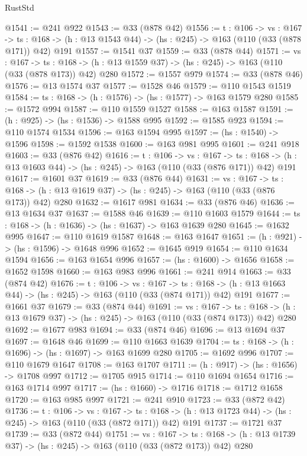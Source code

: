 \begin{lexlean}{RustStd}
\begin{coremodule}
@1541 := @241 @922
@1543 := @33 (@878 @42)
@1556 := {t : @106} ->
  {vs : @167} ->
  {ts : @168} -> (h : @13 @1543 @44) -> (hs : @245) -> @163 (@110 (@33 (@878 @171)) @42) @191
@1557 := @1541 @37
@1559 := @33 (@878 @44)
@1571 := {vs : @167} ->
  {ts : @168} -> (h : @13 @1559 @37) -> (hs : @245) -> @163 (@110 (@33 (@878 @173)) @42) @280
@1572 := @1557 @979
@1574 := @33 (@878 @46)
@1576 := @13 @1574 @37
@1577 := @1528 @46
@1579 := @110 @1543 @1519
@1584 := {ts : @168} -> (h : @1576) -> (hs : @1577) -> @163 @1579 @280
@1585 := @1572 @994
@1587 := @110 @1559 @1527
@1588 := @163 @1587
@1591 := (h : @925) -> (hs : @1536) -> @1588 @995
@1592 := @1585 @923
@1594 := @110 @1574 @1534
@1596 := @163 @1594 @995
@1597 := (hs : @1540) -> @1596
@1598 := @1592 @1538
@1600 := @163 @981 @995
@1601 := @241 @918
@1603 := @33 (@876 @42)
@1616 := {t : @106} ->
  {vs : @167} ->
  {ts : @168} -> (h : @13 @1603 @44) -> (hs : @245) -> @163 (@110 (@33 (@876 @171)) @42) @191
@1617 := @1601 @37
@1619 := @33 (@876 @44)
@1631 := {vs : @167} ->
  {ts : @168} -> (h : @13 @1619 @37) -> (hs : @245) -> @163 (@110 (@33 (@876 @173)) @42) @280
@1632 := @1617 @981
@1634 := @33 (@876 @46)
@1636 := @13 @1634 @37
@1637 := @1588 @46
@1639 := @110 @1603 @1579
@1644 := {ts : @168} -> (h : @1636) -> (hs : @1637) -> @163 @1639 @280
@1645 := @1632 @995
@1647 := @110 @1619 @1587
@1648 := @163 @1647
@1651 := (h : @921) -> (hs : @1596) -> @1648 @996
@1652 := @1645 @919
@1654 := @110 @1634 @1594
@1656 := @163 @1654 @996
@1657 := (hs : @1600) -> @1656
@1658 := @1652 @1598
@1660 := @163 @983 @996
@1661 := @241 @914
@1663 := @33 (@874 @42)
@1676 := {t : @106} ->
  {vs : @167} ->
  {ts : @168} -> (h : @13 @1663 @44) -> (hs : @245) -> @163 (@110 (@33 (@874 @171)) @42) @191
@1677 := @1661 @37
@1679 := @33 (@874 @44)
@1691 := {vs : @167} ->
  {ts : @168} -> (h : @13 @1679 @37) -> (hs : @245) -> @163 (@110 (@33 (@874 @173)) @42) @280
@1692 := @1677 @983
@1694 := @33 (@874 @46)
@1696 := @13 @1694 @37
@1697 := @1648 @46
@1699 := @110 @1663 @1639
@1704 := {ts : @168} -> (h : @1696) -> (hs : @1697) -> @163 @1699 @280
@1705 := @1692 @996
@1707 := @110 @1679 @1647
@1708 := @163 @1707
@1711 := (h : @917) -> (hs : @1656) -> @1708 @997
@1712 := @1705 @915
@1714 := @110 @1694 @1654
@1716 := @163 @1714 @997
@1717 := (hs : @1660) -> @1716
@1718 := @1712 @1658
@1720 := @163 @985 @997
@1721 := @241 @910
@1723 := @33 (@872 @42)
@1736 := {t : @106} ->
  {vs : @167} ->
  {ts : @168} -> (h : @13 @1723 @44) -> (hs : @245) -> @163 (@110 (@33 (@872 @171)) @42) @191
@1737 := @1721 @37
@1739 := @33 (@872 @44)
@1751 := {vs : @167} ->
  {ts : @168} -> (h : @13 @1739 @37) -> (hs : @245) -> @163 (@110 (@33 (@872 @173)) @42) @280

\end{coremodule}
\end{lexlean}
